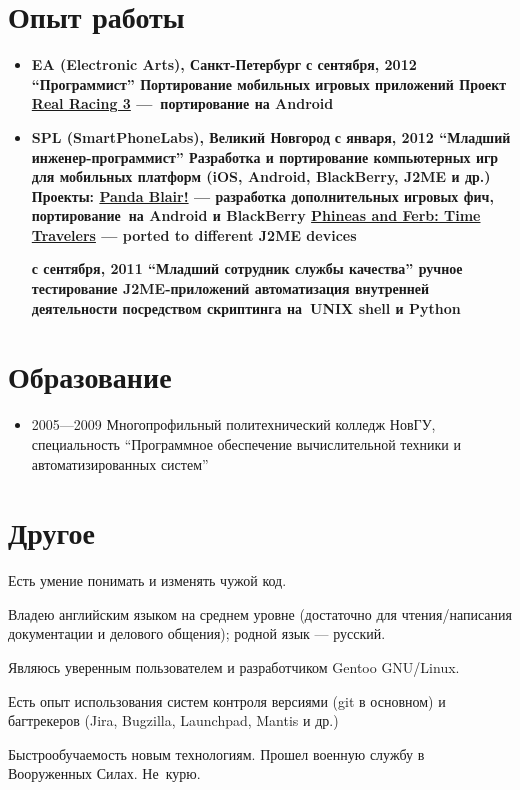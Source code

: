 \section{Опыт работы}
\begin{itemize}
\item {
\fontsize{14pt}{14pt}\selectfont
\bfseries EA (Electronic Arts)\mdseries, Санкт-Петербург
}
\subitem \bfseries с сентября, 2012 ``Программист''\mdseries
\subsubitem Портирование мобильных игровых приложений
\subsubitem Проект \href{http://www.facebook.com/realracing}{Real Racing 3} ---\
портирование на Android

\item {
\fontsize{14pt}{14pt}\selectfont
\bfseries SPL (SmartPhoneLabs)\mdseries, Великий Новгород
}
\subitem \bfseries с января, 2012 ``Младший инженер-программист''\mdseries
\subsubitem Разработка и портирование компьютерных игр для мобильных платформ
(iOS, Android, BlackBerry, J2ME и др.)
\subsubitem Проекты:
\subsubitem\href{https://itunes.apple.com/us/app/panda-blair!/id500995558?mt=8}{Panda Blair!} --- разработка дополнительных игровых фич, портирование\
на Android и BlackBerry
\subsubitem\href{http://java.mob.org/game/phineas\_and\_ferb\_time\_travelers.html}{Phineas and Ferb: Time Travelers} --- ported to different J2ME devices

\subitem \bfseries с сентября, 2011 ``Младший сотрудник службы качества''
\mdseries
\subsubitem ручное тестирование J2ME-приложений
\subsubitem автоматизация внутренней деятельности посредством скриптинга на\
UNIX shell и Python
\end{itemize}

\section{Образование}
\begin{itemize}
\item 2005---2009 Многопрофильный политехнический колледж НовГУ, специальность
``Программное обеспечение вычислительной техники и автоматизированных систем''
\end{itemize}

\section{Другое}
Есть умение понимать и изменять чужой код.

Владею английским языком на среднем уровне (достаточно для чтения/написания
документации и делового общения); родной язык --- русский.

Являюсь уверенным пользователем и разработчиком Gentoo GNU/Linux.

Есть опыт использования систем контроля версиями (git в основном) и
багтрекеров (Jira, Bugzilla, Launchpad, Mantis и др.)

Быстрообучаемость новым технологиям.
Прошел военную службу в Вооруженных Силах.
Не~курю.
